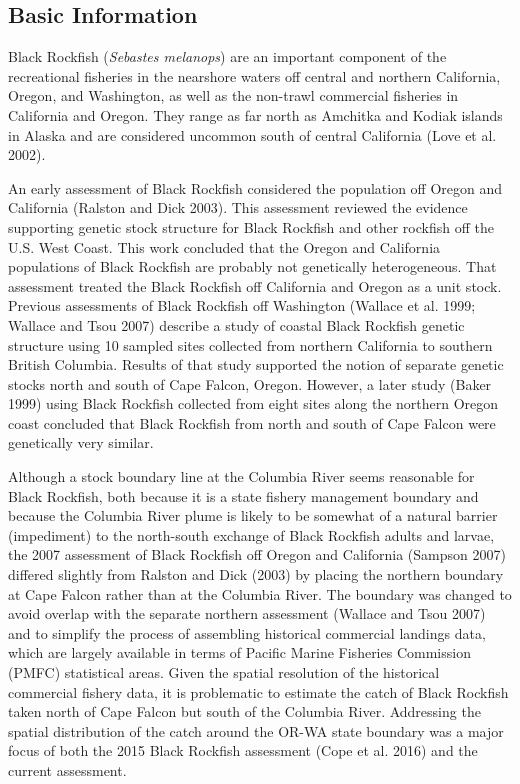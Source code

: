 \documentclass[11pt,
  english,
  letterpaper,
]{article}
\begin{document}
\hypertarget{basic-information}{%
\subsection{Basic Information}\label{basic-information}}

Black Rockfish (\emph{Sebastes melanops}) are an important component of the recreational fisheries in the nearshore waters off central and northern California, Oregon, and Washington, as well as the non-trawl commercial fisheries in California and Oregon. They range as far north as Amchitka and Kodiak islands in Alaska and are considered uncommon south of central California (Love et al. 2002).

An early assessment of Black Rockfish considered the population off Oregon and California (Ralston and Dick 2003). This assessment reviewed the evidence supporting genetic stock structure for Black Rockfish and other rockfish off the U.S. West Coast. This work concluded that the Oregon and California populations of Black Rockfish are probably not genetically heterogeneous. That assessment treated the Black Rockfish off California and Oregon as a unit stock. Previous assessments of Black Rockfish off Washington (Wallace et al. 1999; Wallace and Tsou 2007) describe a study of coastal Black Rockfish genetic structure using 10 sampled sites collected from northern California to southern British Columbia. Results of that study supported the notion of separate genetic stocks north and south of Cape Falcon, Oregon. However, a later study (Baker 1999) using Black Rockfish collected from eight sites along the northern Oregon coast concluded that Black Rockfish from north and south of Cape Falcon were genetically very similar.

Although a stock boundary line at the Columbia River seems reasonable for Black Rockfish, both because it is a state fishery management boundary and because the Columbia River plume is likely to be somewhat of a natural barrier (impediment) to the north-south exchange of Black Rockfish adults and larvae, the 2007 assessment of Black Rockfish off Oregon and California (Sampson 2007) differed slightly from Ralston and Dick (2003) by placing the northern boundary at Cape Falcon rather than at the Columbia River. The boundary was changed to avoid overlap with the separate northern assessment (Wallace and Tsou 2007) and to simplify the process of assembling historical commercial landings data, which are largely available in terms of Pacific Marine Fisheries Commission (PMFC) statistical areas. Given the spatial resolution of the historical commercial fishery data, it is problematic to estimate the catch of Black Rockfish taken north of Cape Falcon but south of the Columbia River. Addressing the spatial distribution of the catch around the OR-WA state boundary was a major focus of both the 2015 Black Rockfish assessment (Cope et al. 2016) and the current assessment.
\end{document}
